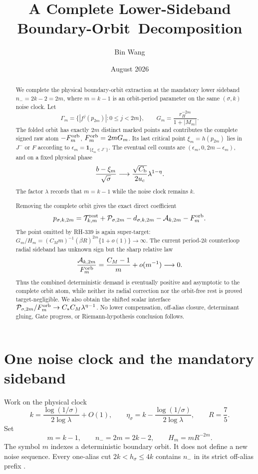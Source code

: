 \documentclass[11pt]{article}
\title{A Complete Lower-Sideband Boundary-Orbit\
Decomposition}
\author{Bin Wang}
\date{August 2026}
\theoremstyle{remark}
\newcommand{\cP}{\mathcal P}
\newcommand{\cA}{\mathcal A}
\newcommand{\cT}{\mathcal T}
\newcommand{\one}{\mathbf 1}
\begin{document}
\maketitle

\begin{abstract}
We complete the physical boundary-orbit extraction at the mandatory lower
sideband $n_-=2k-2=2m$, where $m=k-1$ is an orbit-period parameter on the
same $(\sigma,k)$ noise clock.  Let
\[
 \Gamma_m=\{|f^j(p_{2m})|:0\le j<2m\},\qquad
 G_m=\frac{r_H^{-2m}}{1+|M_m|}.
\]
The folded orbit has exactly $2m$ distinct marked points and contributes the
complete signed raw atom $-F_m^{\rm orb}$, $F_m^{\rm orb}=2mG_m$.  Its last
critical point $\xi_m=h(p_{2m})$ lies in $J^-$ or $F$ according to
$\epsilon_m=\one_{\{\xi_m\in J^-\}}$.  The eventual cell counts are
$(\epsilon_m,0,2m-\epsilon_m)$, and on a fixed physical phase
\[
 \frac{b-\xi_m}{\sqrt\sigma}
 \longrightarrow\frac{\sqrt{C_{\rm b}}}{2u_c}\lambda^{1-\eta}.
\]
The factor $\lambda$ records that $m=k-1$ while the noise clock remains $k$.

Removing the complete orbit gives the exact direct coefficient
\[
 p_{\sigma,k,2m}=\cT_{k,m}^{\rm rest}+\cP_{\sigma,2m}
 -d_{\sigma,k,2m}-\cA_{k,2m}-F_m^{\rm orb}.
\]
The point omitted by RH-339 is again super-target:
$G_m/H_m=(C_Mm)^{-1}(\beta R)^{2m}\{1+o(1)\}\to\infty$.
The current period-$2k$ counterloop radial sideband has unknown sign but the
sharp relative law
\[
 \frac{\cA_{k,2m}}{F_m^{\rm orb}}
 =\frac{C_M-1}{m}+o(m^{-1})\longrightarrow0.
\]
Thus the combined deterministic demand is eventually positive and
asymptotic to the complete orbit atom, while neither its radial correction
nor the orbit-free rest is proved target-negligible.  We also obtain the
shifted scalar interface
$\cP_{\sigma,2m}/F_m^{\rm orb}\to C_*C_M\lambda^{\eta-1}$.
No lower compensation, off-alias closure, determinant gluing, Gate progress,
or Riemann-hypothesis conclusion follows.
\end{abstract}

\section{One noise clock and the mandatory sideband}

Work on the physical clock
\begin{equation}\label{eq:clock}
 k=\frac{\log(1/\sigma)}{2\log\lambda}+O(1),\qquad
 \eta_\sigma=k-\frac{\log(1/\sigma)}{2\log\lambda},\qquad
 R=\frac75.
\end{equation}
Set
\begin{equation}\label{eq:m}
 m=k-1,\qquad n_-=2m=2k-2,\qquad H_m=mR^{-2m}.
\end{equation}
The symbol $m$ indexes a deterministic boundary orbit.  It does not define a
new noise sequence.  Every one-alias cut $2k<h_\sigma\le4k$ contains $n_-$
in its strict off-alias prefix \citep{WangLowerAtom2026}.
\end{document}
